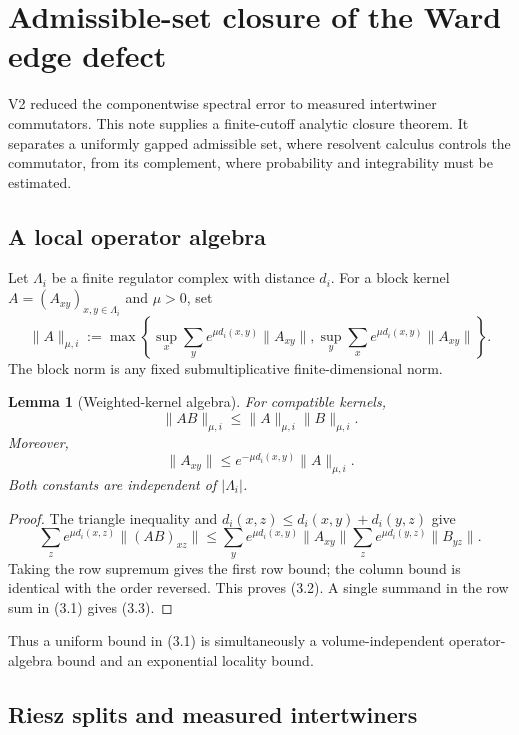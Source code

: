 \documentclass[11pt]{article}
\newtheorem{lemma}[theorem]{Lemma}
\begin{document}
\section{Admissible-set closure of the Ward edge defect}
\label{sec:v11v3}

V2 reduced the componentwise spectral error to measured intertwiner
commutators.  This note supplies a finite-cutoff analytic closure theorem.
It separates a uniformly gapped admissible set, where resolvent calculus
controls the commutator, from its complement, where probability and
integrability must be estimated.

\subsection{A local operator algebra}

Let \(\Lambda_i\) be a finite regulator complex with distance \(d_i\).
For a block kernel \(A=(A_{xy})_{x,y\in\Lambda_i}\) and \(\mu>0\), set
\[
 \|A\|_{\mu,i}
 :=
 \max\left\{
 \sup_x\sum_y e^{\mu d_i(x,y)}\|A_{xy}\|,
 \sup_y\sum_x e^{\mu d_i(x,y)}\|A_{xy}\|
 \right\}.
 \tag{3.1}
\]
The block norm is any fixed submultiplicative finite-dimensional norm.

\begin{lemma}[Weighted-kernel algebra]
\label{lem:v11v3-weighted-algebra}
For compatible kernels,
\[
 \|AB\|_{\mu,i}\leq\|A\|_{\mu,i}\|B\|_{\mu,i}.
 \tag{3.2}
\]
Moreover,
\[
 \|A_{xy}\|\leq e^{-\mu d_i(x,y)}\|A\|_{\mu,i}.
 \tag{3.3}
\]
Both constants are independent of \(|\Lambda_i|\).
\end{lemma}

\begin{proof}
The triangle inequality and
\(d_i(x,z)\leq d_i(x,y)+d_i(y,z)\) give
\[
 \sum_z e^{\mu d_i(x,z)}\|(AB)_{xz}\|
 \leq
 \sum_y e^{\mu d_i(x,y)}\|A_{xy}\|
 \sum_z e^{\mu d_i(y,z)}\|B_{yz}\|.
\]
Taking the row supremum gives the first row bound; the column bound is
identical with the order reversed.  This proves (3.2).  A single summand in
the row sum in (3.1) gives (3.3).
\end{proof}

Thus a uniform bound in (3.1) is simultaneously a volume-independent
operator-algebra bound and an exponential locality bound.

\subsection{Riesz splits and measured intertwiners}
\end{document}
